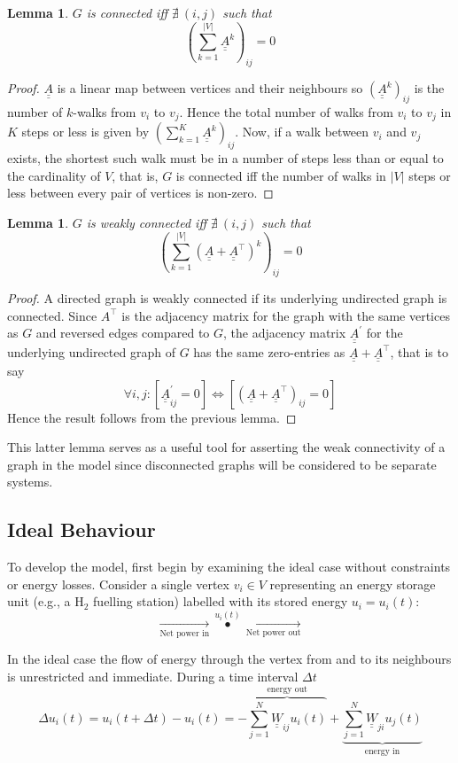 \documentclass[]{article}
\def \mat#1{\underline{\underline{#1}}}
\numberwithin{equation}{section}
\theoremstyle{plain} %
\newtheorem{lem}[equation]{Lemma}
\theoremstyle{definition}
\theoremstyle{remark}
\begin{document}
\begin{lem}
    $G$ is connected iff $\nexists\ (i, j)$ such that $$\left (\sum_{k = 1}^{|V|} \mat{A}^k\right )_{ij}=0$$
\end{lem}
\begin{proof}
    $\mat A$ is a linear map between vertices and their neighbours so
    $(\mat{A}^k)_{ij}$ is the number of $k$-walks from $v_i$ to $v_j$.
    Hence the total number of walks from $v_i$ to $v_j$ in $K$ steps or less is given by
    $\left (\sum_{k = 1}^{K}\mat{A}^k\right )_{ij}$.
    Now, if a walk between $v_i$ and $v_j$ exists,
    the shortest such walk must be in a number of steps less than or equal to the cardinality of $V$,
    that is, $G$ is connected iff the number of walks in $|V|$ steps or less between every pair of vertices is non-zero.
\end{proof}
\begin{lem}
    $G$ is weakly connected iff $\nexists\ (i, j)$ such that $$\left (\sum_{k = 1}^{|V|} \left (\mat{A}+\mat{A}^\top\right )^k\right )_{ij}=0$$
\end{lem}
\begin{proof}
    A directed graph is weakly connected if its underlying undirected graph is connected.
    Since $A^\top$ is the adjacency matrix for the graph with the same vertices as $G$ and reversed edges compared to $G$,
    the adjacency matrix $\mat A^\prime$ for the underlying undirected graph of $G$ has the same zero-entries as $\mat A+\mat A^\top$, that is to say
    $$\forall i, j: [\mat A^\prime_{ij} = 0]\Leftrightarrow [(\mat A+\mat A^\top)_{ij} = 0]  $$
    Hence the result follows from the previous lemma.
\end{proof}
This latter lemma serves as a useful tool for asserting the weak connectivity of a graph in the model
since disconnected graphs will be considered to be separate systems.

\subsection{Ideal Behaviour}
To develop the model, first begin by examining the ideal case without constraints or energy losses.
Consider a single vertex $v_i\in V$ representing an energy storage unit (e.g., a $\mathrm{H_2}$ fuelling station) labelled with its stored energy $u_i=u_i(t)$:
$$\xrightarrow[\text{Net power in}]{}\overset{u_i(t)}{\bullet} \xrightarrow[\text{Net power out}]{}$$

In the ideal case the flow of energy through the vertex from and to its neighbours is unrestricted and immediate. During a time interval $\varDelta t$
$$\varDelta u_i(t)=u_i(t+\varDelta t)-u_i(t)=-\overbrace{\sum_{j=1}^{N}\mat W_{ij}u_i(t)}^{\text{energy out}}+\underbrace{\sum_{j=1}^{N}\mat W_{ji}u_j(t)}_{\text{energy in}}$$
\end{document}
